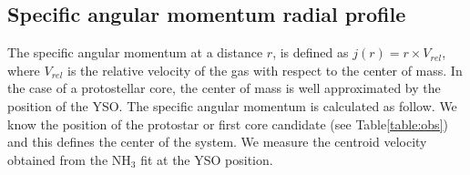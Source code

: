 \subsection{Specific angular momentum radial profile}
The specific angular momentum at a distance $r$, is defined as $j(r)=r \times V_{rel}$, 
where $V_{rel}$ is the relative velocity of the gas with respect to the center of mass. 
In the case of a protostellar core, the center of mass is well approximated by the position of 
the YSO. 
%
The specific angular momentum is calculated as follow.
We know the position of the protostar or first core candidate (see Table\ref{table:obs}) and this 
defines the center of the system.
We measure the centroid velocity obtained from the NH$_3$ fit at the YSO position. 